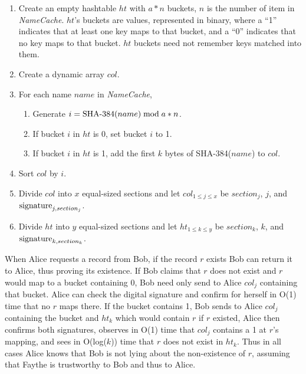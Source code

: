 \begin{enumerate}
	\item Create an empty hashtable $ ht $ with $ a * n $ buckets, $ n $ is the number of item in \emph{NameCache}. $ ht $'s buckets are values, represented in binary, where a ``1'' indicates that at least one key maps to that bucket, and a ``0'' indicates that no key maps to that bucket. $ ht $ buckets need not remember keys matched into them.
	\item Create a dynamic array $ col $.
	\item For each name $ name $ in \emph{NameCache},
	\begin{enumerate}
		\item Generate $ i = \textnormal{SHA-384}(name) \bmod a * n $.
		\item If bucket $ i $ in $ ht $ is 0, set bucket $ i $ to 1.
		\item If bucket $ i $ in $ ht $ is 1, add the first $ k $ bytes of \textnormal{SHA-384}($ name $) to $ col $.
	\end{enumerate}
	\item Sort $ col $ by $ i $.
	\item Divide $ col $ into $ x $ equal-sized sections and let $ col_{ 1 \le j \le x } $ be $ section_{j} $, $ j $, and $ \textnormal{signature}_{j, section_{j}} $.
	\item Divide $ ht $ into $ y $ equal-sized sections and let $ ht_{ 1 \le k \le y } $ be $ section_{k} $, $ k $, and $ \textnormal{signature}_{k, section_{k}} $.
\end{enumerate}

When Alice requests a record from Bob, if the record $ r $ exists Bob can return it to Alice, thus proving its existence. If Bob claims that $ r $ does not exist and $ r $ would map to a bucket containing 0, Bob need only send to Alice $ col_{j} $ containing that bucket. Alice can check the digital signature and confirm for herself in O(1) time that no $ r $ maps there. If the bucket contains 1, Bob sends to Alice $ col_{j} $ containing the bucket and $ ht_{k} $ which would contain $ r $ if $ r $ existed, Alice then confirms both signatures, observes in O(1) time that $ col_{j} $ contains a 1 at $ r $'s mapping, and sees in O(log($ k $)) time that $ r $ does not exist in $ ht_{k} $. Thus in all cases Alice knows that Bob is not lying about the non-existence of $ r $, assuming that Faythe is trustworthy to Bob and thus to Alice.


